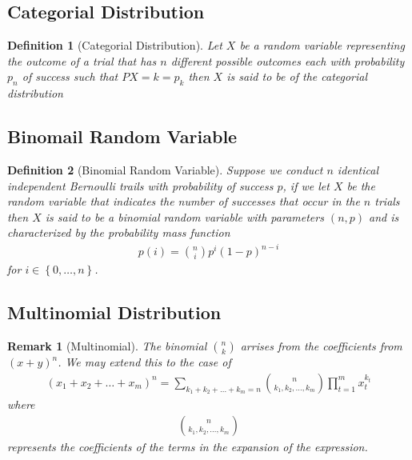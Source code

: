 \documentclass[11pt, oneside]{book}   	%
\newtheorem{definition}{Definition}[chapter]
\newtheorem{remark}{Remark}[chapter]
\begin{document}
\begin{spacing}{1.618}
\subsection{Categorial Distribution}

\begin{definition}[Categorial Distribution]
	Let $X$ be a random variable representing the outcome of a trial that has $n$ different possible outcomes each with probability $p_n$ of success such that $P{X=k}=p_k$ then $X$ is said to be of the \emph{categorial distribution}
\end{definition}

\subsection{Binomail Random Variable}
\begin{definition}[Binomial Random Variable]
	Suppose we conduct $n$ identical independent Bernoulli trails with probability of success $p$, if we let $X$ be the random variable that indicates the number of successes that occur in the $n$ trials then $X$ is said to be a binomial random variable with parameters $(n, p)$ and is characterized by the probability mass function
	\begin{alignat}{4}
		p(i)=\binom{n}{i}p^i(1-p)^{n-i}
	\end{alignat}
	for $i\in \left\{0, \dots, n\right\}$. 
\end{definition}

\subsection{Multinomial Distribution}

\begin{remark}[Multinomial]
	The binomial $\binom{n}{k}$ arrises from the coefficients from $(x+y)^n$. We may extend this to the case of
	\begin{alignat}{4}
		(x_1+x_2+\dots +x_m)^n=\sum_{k_1+k_2+\dots +k_m=n}\binom{n}{k_1, k_2, \dots, k_m}\prod_{t=1}^m x_t^{k_t}
	\end{alignat}
	where
	\begin{alignat}{4}
		\binom{n}{k_1, k_2, \dots, k_m}
	\end{alignat}
	represents the coefficients of the terms in the expansion of the expression. 
\end{remark}


\end{spacing}
\end{document}
